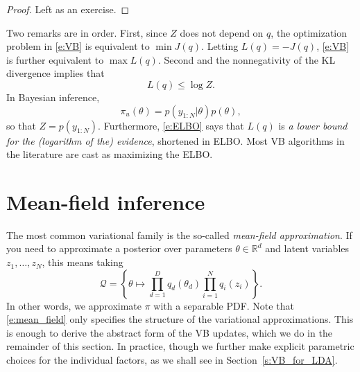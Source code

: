 \begin{proof}
  Left as an exercise.
\end{proof}

Two remarks are in order.
First, since $Z$ does not depend on $q$, the optimization problem in \eqref{e:VB} is equivalent to $\min J(q)$.
Letting $ L(q) = -J(q)$, \eqref{e:VB} is further equivalent to $\max L(q)$.
Second and the nonnegativity of the KL divergence implies that
\begin{equation}
L(q) \leq \log Z.
\label{e:ELBO}
\end{equation}
In Bayesian inference,
$$
\pi_u(\theta) = p(y_{1:N}\vert\theta) p(\theta),
$$
so that $Z=p(y_{1:N})$.
Furthermore, \eqref{e:ELBO} says that $L(q)$ is \emph{a lower bound for the (logarithm of the) evidence}, shortened in ELBO.
Most VB algorithms in the literature are cast as maximizing the ELBO.

\section{Mean-field inference}
The most common variational family is the so-called \emph{mean-field approximation}.
If you need to approximate a posterior over parameters $\theta\in\mathbb{R}^d$ and latent variables $z_1,\dots,z_N$, this means taking
\begin{equation}
  \label{e:mean_field}
  \mathcal Q = \left\{\theta\mapsto \prod_{d=1}^D q_d(\theta_d) \prod_{i=1}^N q_i(z_i)\right\}.
\end{equation}
In other words, we approximate $\pi$ with a separable PDF.
Note that \eqref{e:mean_field} only specifies the structure of the variational approximations.
This is enough to derive the abstract form of the VB updates, which we do in the remainder of this section.
In practice, though we further make explicit parametric choices for the individual factors, as we shall see in Section~\ref{s:VB_for_LDA}.

